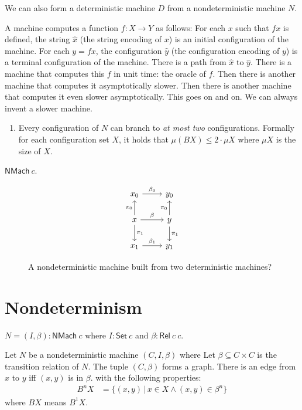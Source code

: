 \documentclass[10pt,statementpaper]{memoir}
\theoremstyle{definition}
\newcommand\NMach[1]{\mathsf{NMach}~#1}
\newcommand\sfSet{\mathsf{Set}}
\newcommand\sfRel{\mathsf{Rel}}
\newcommand\Set[1]{\sfSet~#1}
\newcommand\Relab[2]{\sfRel~#1~#2}
\begin{document}
We can also form a deterministic machine $D$ from a nondeterministic machine $N$.

A machine computes a function $f : X \to Y$ as follows:
For each $x$ such that $f x$ is defined, the string $\hat x$ (the string encoding of $x$)
is an initial configuration of the machine.
For each $y = fx$, the configuration $\hat y$ (the configuration encoding of $y$)
is a terminal configuration of the machine.
There is a path from $\hat x$ to $\hat y$.
There is a machine that computes this $f$ in unit time: the oracle of $f$.
Then there is another machine that computes it asymptotically slower.
Then there is another machine that computes it even slower asymptotically.
This goes on and on.
We can always invent a slower machine.

\begin{enumerate}
    \item
        Every configuration of $N$ can branch to \emph{at most two} configurations.
        Formally for each configuration set $X$, it holds that $\mu(B X) \le 2 \cdot \mu X$
        where $\mu X$ is the size of $X$.
\end{enumerate}

$\NMach c$.

\begin{figure}[h]
\[
\begin{tikzcd}
    x_0 \arrow[r, "\beta_0"] & y_0
    \\
    x \arrow[r, "\beta"] \arrow[u, "\pi_0"] \arrow[d, "\pi_1"] & y \arrow[u, "\pi_0"] \arrow[d, "\pi_1"]
    \\
    x_1 \arrow[r, "\beta_1"] & y_1
\end{tikzcd}
\]
    \caption{A nondeterministic machine built from two deterministic machines?}
\end{figure}

\section{Nondeterminism}

$N = (I,\beta) : \NMach c$
where $I : \Set{c}$ and $\beta : \Relab{c}{c}$.

Let $N$ be a nondeterministic machine $(C,I,\beta)$ where
Let $\beta \subseteq C \times C$ is the transition relation of $N$.
The tuple $(C,\beta)$ forms a graph.
There is an edge from $x$ to $y$ iff $(x,y)$ is in $\beta$.
with the following properties:
\begin{align}
    B^n X &= \{ (x,y) \,|\, x \in X \wedge (x,y) \in \beta^n \}
\end{align}
where $B X$ means $B^1 X$.
\end{document}
